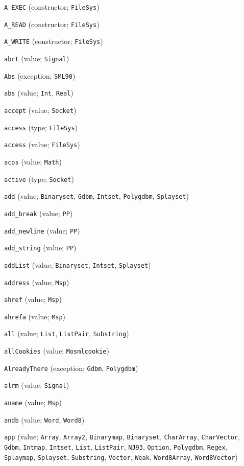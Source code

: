 \begin{description}
\item[] \verb"A_EXEC" (constructor; \verb"FileSys")
\item[] \verb"A_READ" (constructor; \verb"FileSys")
\item[] \verb"A_WRITE" (constructor; \verb"FileSys")
\item[] \verb"abrt" (value; \verb"Signal")
\item[] \verb"Abs" (exception; \verb"SML90")
\item[] \verb"abs" (value; \verb"Int", \verb"Real")
\item[] \verb"accept" (value; \verb"Socket")
\item[] \verb"access" (type; \verb"FileSys")
\item[] \verb"access" (value; \verb"FileSys")
\item[] \verb"acos" (value; \verb"Math")
\item[] \verb"active" (type; \verb"Socket")
\item[] \verb"add" (value; \verb"Binaryset", \verb"Gdbm", \verb"Intset", \verb"Polygdbm", \verb"Splayset")
\item[] \verb"add_break" (value; \verb"PP")
\item[] \verb"add_newline" (value; \verb"PP")
\item[] \verb"add_string" (value; \verb"PP")
\item[] \verb"addList" (value; \verb"Binaryset", \verb"Intset", \verb"Splayset")
\item[] \verb"address" (value; \verb"Msp")
\item[] \verb"ahref" (value; \verb"Msp")
\item[] \verb"ahrefa" (value; \verb"Msp")
\item[] \verb"all" (value; \verb"List", \verb"ListPair", \verb"Substring")
\item[] \verb"allCookies" (value; \verb"Mosmlcookie")
\item[] \verb"AlreadyThere" (exception; \verb"Gdbm", \verb"Polygdbm")
\item[] \verb"alrm" (value; \verb"Signal")
\item[] \verb"aname" (value; \verb"Msp")
\item[] \verb"andb" (value; \verb"Word", \verb"Word8")
\item[] \verb"app" (value; \verb"Array", \verb"Array2", \verb"Binarymap", \verb"Binaryset", \verb"CharArray", \verb"CharVector", \verb"Gdbm", \verb"Intmap", \verb"Intset", \verb"List", \verb"ListPair", \verb"NJ93", \verb"Option", \verb"Polygdbm", \verb"Regex", \verb"Splaymap", \verb"Splayset", \verb"Substring", \verb"Vector", \verb"Weak", \verb"Word8Array", \verb"Word8Vector")

\end{description}

